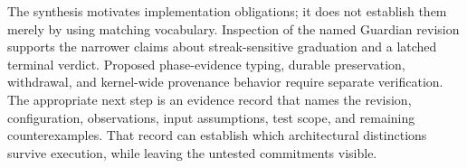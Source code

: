 \documentclass[11pt]{article}
\begin{document}
The synthesis motivates implementation obligations; it does not establish them merely by using matching vocabulary. Inspection of the named Guardian revision supports the narrower claims about streak-sensitive graduation and a latched terminal verdict. Proposed phase-evidence typing, durable preservation, withdrawal, and kernel-wide provenance behavior require separate verification. The appropriate next step is an evidence record that names the revision, configuration, observations, input assumptions, test scope, and remaining counterexamples. That record can establish which architectural distinctions survive execution, while leaving the untested commitments visible.
\end{document}
